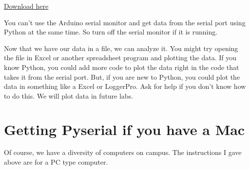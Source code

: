 \href{https://dtoliphant.github.io/PH250Manual/Code/Data2Computer_ArduinoSide_Win.ino}{Download here}

%
% 
%    

You can't use the Arduino serial monitor and get data from the serial port
using Python at the same time. So turn off the serial monitor if it is
running.

Now that we have our data in a file, we can analyze it. You might try
opening the file in Excel or another spreadsheet program and plotting the
data. If you know Python, you could add more code to plot the data right in
the code that takes it from the serial port. But, if you are new to Python,
you could plot the data in something like a Excel or LoggerPro. Ask for help
if you don't know how to do this. We will plot data in future labs.

\section{Getting Pyserial if you have a Mac}

Of course, we have a diversity of computers on campus. The instructions I
gave above are for a PC type computer.

